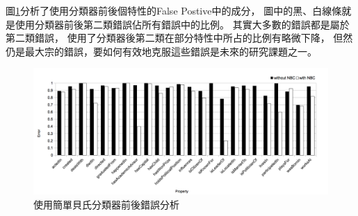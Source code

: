 圖\ref{i:error}分析了使用分類器前後個特性的False Postive中的成分，
圖中的黑、白線條就是使用分類器前後第二類錯誤佔所有錯誤中的比例。
其實大多數的錯誤都是屬於第二類錯誤，
使用了分類器後第二類在部分特性中所占的比例有略微下降，
但然仍是最大宗的錯誤，要如何有效地克服這些錯誤是未來的研究課題之一。

\begin{figure}[h]
    \centering
    \includegraphics[width=\textwidth]{images/04-error}
    \caption{使用簡單貝氏分類器前後錯誤分析}
    \label{i:error}
\end{figure}

